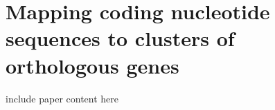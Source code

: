 
\chapter{Mapping coding nucleotide sequences to clusters of orthologous
genes}
\label{cha:orthograph}

include paper content here
